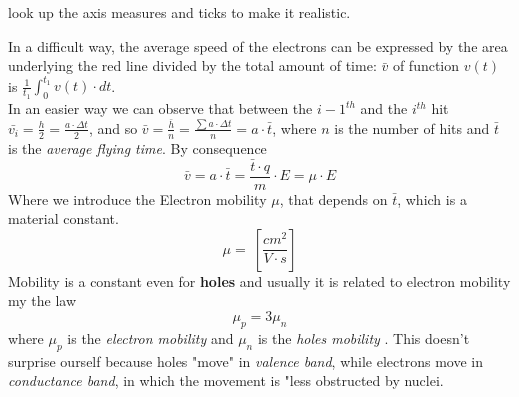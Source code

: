 \documentclass[12pt]{article}
\newcommand{\B}{\textbf}
\newcommand{\I}{\textit}
\begin{document}
 look up the axis measures and ticks to make it realistic. 
\begin{center}
\end{center}
In a difficult way, the average speed of the electrons can be expressed by the area underlying the red line divided by the total amount of time: $\bar{v}$ of function $v(t)$ is $\frac{1}{t_1}\int_{0}^{t_1} v(t) \cdot dt$.\\
In an easier way we can observe that between the $i-1^{th}$  and the $i^{th}$ hit $\bar{v_i} = \frac{h}{2} = \frac{a\cdot \Delta t}{2}$, and so $\bar{v} = \frac{\bar{h}}{n}= \frac{\sum a \cdot \Delta t}{n} = a \cdot \bar{t}$, where $n$ is the number of hits and $\bar{t}$ is the \I{average flying time}. 
By consequence
\begin{equation}
	\bar{v} = a \cdot \bar{t} = \frac{\bar{t} \cdot q}{m}\cdot E = \mu \cdot E
\end{equation}  
Where we introduce the  Electron mobility $\mu$, that depends on $\bar{t}$, which is a material constant.
\begin{equation}
	\mu = \ [\frac{cm^2}{V \cdot s}]
\end{equation}  
Mobility is a constant even for \B{holes} and usually it is related to electron mobility my the law
\begin{equation}
	\mu_p = 3\mu_n
\end{equation}
where $\mu_p$ is the \I{electron mobility} and $\mu_n$ is the \I{holes mobility} . This doesn't surprise ourself because holes "move" in \I{valence band}, while electrons move in \I{conductance band}, in which the movement is "less obstructed by nuclei.  
\end{document}
